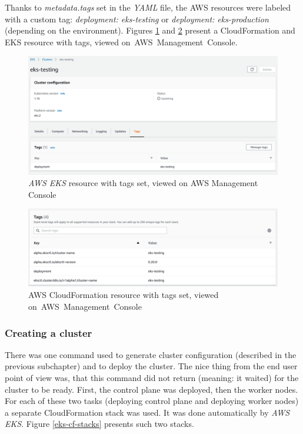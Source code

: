 Thanks to \textit{metadata.tags} set in the \textit{YAML} file, the AWS resources were labeled with a custom tag: \textit{deployment: eks-testing} or \textit{deployment: eks-production} (depending on the environment). Figures \ref{eks-on-aws-mc-tags} and \ref{eks-cf-tags} present a CloudFormation and EKS resource with tags, viewed on~AWS~Management~Console.
\begin{figure}[H]
    \centering
    \includegraphics[width=16cm]{figures/eks-on-aws-mc-tags.png}
    \captionsetup{justification=centering,margin=2cm}
    \caption{\textit{AWS EKS} resource with tags set, viewed on AWS Management Console}
    \label{eks-on-aws-mc-tags}
\end{figure}
\begin{figure}[H]
    \centering
    \includegraphics[width=16cm]{figures/eks-cf-tags.png}
    \captionsetup{justification=centering,margin=2cm}
    \caption{AWS CloudFormation resource with tags set, viewed on~AWS~Management~Console}
    \label{eks-cf-tags}
\end{figure}


\subsubsection{Creating a cluster}
There was one command used to generate cluster configuration (described in the previous subchapter) and to deploy the cluster. The nice thing from the end user point of view was, that this command did not return (meaning: it waited) for the cluster to be ready. First, the control plane was deployed, then the worker nodes. For each of these two tasks (deploying control plane and deploying worker nodes) a separate CloudFormation stack was used. It was done automatically by \textit{AWS EKS}. Figure \ref{eks-cf-stacks} presents such two stacks.

